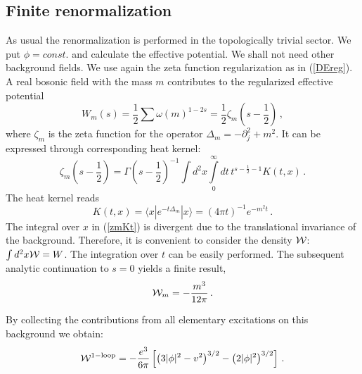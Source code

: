 \documentclass[a4paper,12pt]{article}
\begin{document}
\subsection{Finite renormalization}
As usual the renormalization is performed in the topologically
trivial sector. We put $\phi =const.$ and calculate the effective
potential. We shall not need other background fields. We use again
the zeta function regularization as in (\ref{DEreg}). A real
bosonic field with the mass $m$ contributes to the regularized
effective potential
\begin{equation}
W_m(s)=\frac 12 \sum \omega (m)^{1-2s} = \frac 12 \zeta_m \left(
s-\frac 12\right) \,, \label{mW}
\end{equation}
where $\zeta_m$ is the zeta function for the operator
$\Delta_m=-\partial_j^2+m^2$. It can be expressed through
corresponding heat kernel:
\begin{equation}
\zeta_m \left( s-\frac 12\right)= \Gamma \left( s-\frac
12\right)^{-1} \int d^2x \int\limits_0^\infty dt\, t^{s-\frac 12
-1} K(t,x) \,.\label{zmKt}
\end{equation}
The heat kernel reads
\begin{equation}
K(t,x)=\langle x | e^{-t\Delta_m } | x\rangle = (4\pi t)^{-1}
e^{-m^2t} \,.\label{Ktx}
\end{equation}
The integral over $x$ in (\ref{zmKt}) is divergent due to the
translational invariance of the background. Therefore, it is
convenient to consider the density ${\cal W}$: $\int d^2 x{\cal
W}=W$. The integration over $t$ can be easily performed. The
subsequent analytic continuation to $s=0$ yields a finite result,
\begin{equation}
{\cal W}_m =-\frac {m^3}{12\pi} \,.\label{cWm}
\end{equation}

By collecting the contributions from all elementary excitations on
this background we obtain:
\begin{equation}
{\cal W}^{\rm 1-loop} = -\frac{e^3}{6\pi} \left[ \left( 3|\phi |^2
-v^2 \right)^{3/2} -\left( 2|\phi |^2 \right)^{3/2} \right]
\,.\label{W1loop}
\end{equation}
\end{document}
